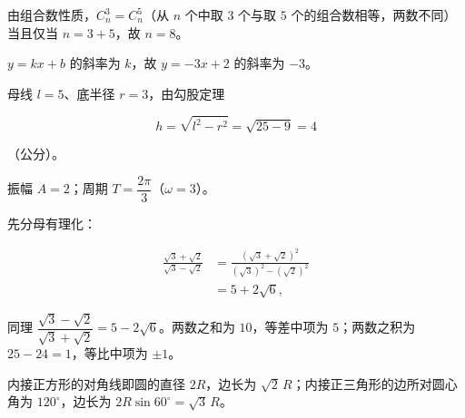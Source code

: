 \begin{answer}
由组合数性质，$C_n^3=C_n^5$（从 $n$ 个中取 $3$ 个与取 $5$ 个的组合数相等，两数不同）当且仅当 $n=3+5$，故 $n=8$。


$y=kx+b$ 的斜率为 $k$，故 $y=-3x+2$ 的斜率为 $-3$。


母线 $l=5$、底半径 $r=3$，由勾股定理

\nopagebreak[4]
\[
h=\sqrt{l^2-r^2}=\sqrt{25-9}=4
\]

（公分）。


振幅 $A=2$；周期 $T=\dfrac{2\pi}{3}$（$\omega=3$）。


先分母有理化：

\nopagebreak[4]
\[
\begin{aligned}
\frac{\sqrt3+\sqrt2}{\sqrt3-\sqrt2}
&=\frac{(\sqrt3+\sqrt2)^2}{(\sqrt3)^2-(\sqrt2)^2}\\
&=5+2\sqrt6,
\end{aligned}
\]

同理 $\dfrac{\sqrt3-\sqrt2}{\sqrt3+\sqrt2}=5-2\sqrt6$。两数之和为 $10$，等差中项为 $5$；两数之积为 $25-24=1$，等比中项为 $\pm1$。


内接正方形的对角线即圆的直径 $2R$，边长为 $\sqrt2\,R$；内接正三角形的边所对圆心角为 $120^\circ$，边长为 $2R\sin 60^\circ=\sqrt3\,R$。
















\end{answer}
